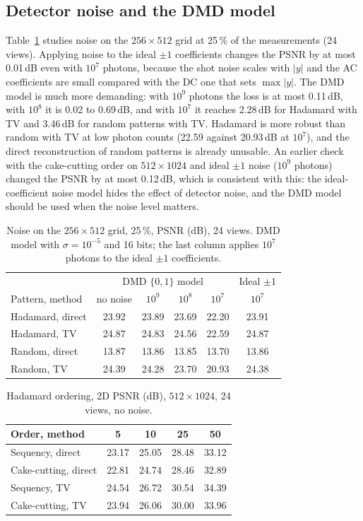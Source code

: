 \documentclass[conference]{IEEEtran}
\begin{document}
\subsection{Detector noise and the DMD model}
Table~\ref{tab:noise} studies noise on the $256\times512$ grid at 25\,\% of the measurements (24 views). Applying noise to the
ideal $\pm1$ coefficients changes the PSNR by at most 0.01\,dB even with $10^{7}$ photons, because the shot noise scales with
$|y|$ and the AC coefficients are small compared with the DC one that sets $\max|y|$. The DMD model is much more demanding: with
$10^{9}$ photons the loss is at most 0.11\,dB, with $10^{8}$ it is 0.02 to 0.69\,dB, and with $10^{7}$ it reaches 2.28\,dB
for Hadamard with TV and 3.46\,dB for random patterns with TV. Hadamard is more robust than random with TV at low photon counts
(22.59 against 20.93\,dB at $10^{7}$), and the direct reconstruction of random patterns is already unusable. An earlier check
with the cake-cutting order on $512\times1024$ and ideal $\pm1$ noise ($10^9$ photons) changed the PSNR by at most 0.12\,dB,
which is consistent with this: the ideal-coefficient noise model hides the effect of detector noise, and the DMD model should be
used when the noise level matters.

\begin{table}[t]
\caption{Noise on the $256\times512$ grid, 25\,\%, PSNR (dB), 24 views. DMD model with $\sigma=10^{-5}$ and 16 bits; the last column
applies $10^{7}$ photons to the ideal $\pm1$ coefficients.}
\label{tab:noise}
\centering
\footnotesize
\setlength{\tabcolsep}{3pt}
\begin{tabular}{lccccc}
\toprule
 & \multicolumn{4}{c}{DMD $\{0,1\}$ model} & Ideal $\pm1$ \\
Pattern, method & no noise & $10^{9}$ & $10^{8}$ & $10^{7}$ & $10^{7}$ \\
\midrule
Hadamard, direct & 23.92 & 23.89 & 23.69 & 22.20 & 23.91 \\
Hadamard, TV & 24.87 & 24.83 & 24.56 & 22.59 & 24.87 \\
Random, direct & 13.87 & 13.86 & 13.85 & 13.70 & 13.86 \\
Random, TV & 24.39 & 24.28 & 23.70 & 20.93 & 24.38 \\
\bottomrule
\end{tabular}
\end{table}

\begin{table}[t]
\caption{Hadamard ordering, 2D PSNR (dB), $512\times1024$, 24 views, no noise.}
\label{tab:order}
\centering
\footnotesize
\begin{tabular}{lcccc}
\toprule
Order, method & 5 & 10 & 25 & 50 \\
\midrule
Sequency, direct & 23.17 & 25.05 & 28.48 & 33.12 \\
Cake-cutting, direct & 22.81 & 24.74 & 28.46 & 32.89 \\
Sequency, TV & 24.54 & 26.72 & 30.54 & 34.39 \\
Cake-cutting, TV & 23.94 & 26.06 & 30.00 & 33.96 \\
\bottomrule
\end{tabular}
\end{table}
\end{document}
